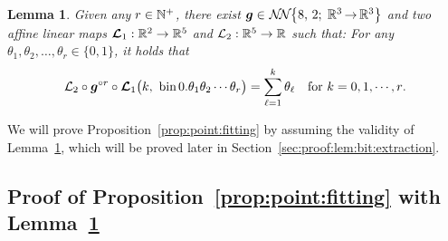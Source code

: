 \documentclass[nohyperref]{article}
\theoremstyle{plain}
\newtheorem{lemma}[theorem]{Lemma}
\theoremstyle{definition}
\theoremstyle{remark}
\begin{document}
\begin{lemma}
	\label{lem:bit:extraction}
	Given any $r\in \N^+$,
	there exist
	$\bmg\in \nn[\big]{8}{2}{3}{3}$ and two affine linear maps $\bmcalL_1:\R^2\to\R^5$ and $\calL_2:\R^5\to \R$
	such that: For any $\theta_1,\theta_2,\dotsc,\theta_{r}\in \{0,1\}$, it holds that
	\begin{equation}\label{eq:bit:extraction}
		\calL_2\circ\bmg^{\circ r}\circ \bmcalL_1\big(k,\ \bin 0.\theta_1\theta_2\cdots\theta_{r}\big)=\sum_{\ell=1}^{k}\theta_\ell \quad \tn{for $k=0,1,\dotsc,r$.}
	\end{equation}
\end{lemma}

We will prove Proposition~\ref{prop:point:fitting} by assuming the validity of Lemma~\ref{lem:bit:extraction}, which
will be proved later in Section~\ref{sec:proof:lem:bit:extraction}.

\subsection{Proof of Proposition~\ref{prop:point:fitting} with Lemma~\ref{lem:bit:extraction}}
\end{document}

